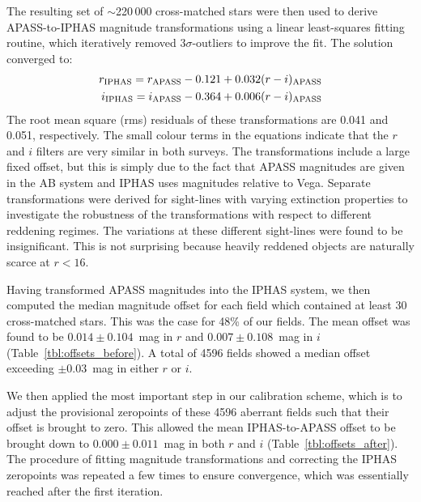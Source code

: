 \documentclass[useAMS,usenatbib]{mn2e}
\begin{document}
The resulting set of $\sim$220\,000 cross-matched stars were then used 
to derive APASS-to-IPHAS magnitude transformations
using a linear least-squares fitting routine, 
which iteratively removed $3\sigma$-outliers to improve the fit.
The solution converged to:
\begin{align} 
r_{\rm IPHAS} = r_{\rm APASS} - 0.121 + 0.032(r-i)_{\rm APASS} \label{eqn:apass_r} \\
i_{\rm IPHAS} = i_{\rm APASS} - 0.364 + 0.006(r-i)_{\rm APASS} \label{eqn:apass_i}
\end{align}
The root mean square (rms) residuals of these transformations 
are 0.041 and 0.051, respectively.
The small colour terms in the equations
indicate that the $r$ and $i$ filters 
are very similar in both surveys.
The transformations include a large fixed offset,
but this is simply due to the fact that 
APASS magnitudes are given in the AB system
and IPHAS uses magnitudes relative to Vega.
Separate transformations were derived for sight-lines 
with varying extinction properties to investigate the robustness
of the transformations with respect to different reddening regimes.
The variations at these different
sight-lines were found to be insignificant.
This is not surprising because heavily reddened objects 
are naturally scarce at $r<16$.

Having transformed APASS magnitudes into the IPHAS system,
we then computed the median magnitude offset 
for each field which contained at least 30 cross-matched stars.
This was the case for 48\% of our fields.
The mean offset was found to be
$0.014\pm0.104$~mag in $r$ and $0.007\pm0.108$~mag in $i$
(Table~\ref{tbl:offsets_before}).
A total of 4596 fields showed a median offset
exceeding $\pm$0.03~mag in either $r$ or $i$.

We then applied the most important step in our calibration scheme,
which is to adjust the provisional zeropoints of these 4596 aberrant fields
such that their offset is brought to zero.
This allowed the mean IPHAS-to-APASS offset 
to be brought down to $0.000\pm0.011$~mag in both $r$ and $i$
(Table~\ref{tbl:offsets_after}).
The procedure of fitting magnitude transformations and
correcting the IPHAS zeropoints was repeated a few times to ensure 
convergence, which was essentially reached after the first iteration.
\end{document}
